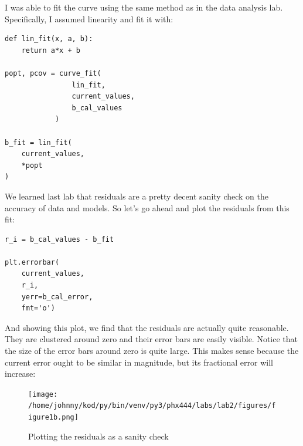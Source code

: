 \documentclass{article}
\begin{document}
I was able to fit the curve using the same method as in the data
analysis lab. Specifically, I assumed linearity and fit it with:

\begin{center}
\begin{minipage}[t]{.75\textwidth}
\begin{lstlisting}[frame=tlrb]
def lin_fit(x, a, b):
    return a*x + b

popt, pcov = curve_fit(
                lin_fit, 
                current_values, 
                b_cal_values
            )

b_fit = lin_fit(
    current_values, 
    *popt
)
\end{lstlisting}
\end{minipage}
\end{center}

We learned last lab that residuals are a pretty decent sanity check on the
accuracy of data and models. So let's go ahead and plot the residuals from this
fit:

\begin{center}
\begin{minipage}[t]{.75\textwidth}
\begin{lstlisting}[frame=tlrb]
r_i = b_cal_values - b_fit

plt.errorbar(
    current_values,
    r_i,
    yerr=b_cal_error,
    fmt='o')
\end{lstlisting}
\end{minipage}
\end{center}

And showing this plot, we find that the residuals are actually quite
reasonable. They are clustered around zero and their error bars are easily
visible. Notice that the size of the error bars around zero is quite large.
This makes sense because the current error ought to be similar in magnitude, but
its fractional error will increase:

\begin{figure}[H]
        \begin{center}
        \texttt{[image: /home/johnny/kod/py/bin/venv/py3/phx444/labs/lab2/figures/figure1b.png]}
        \caption{Plotting the residuals as a sanity check}
        \label{fig:fig_2}
        \end{center}
\end{figure}
\end{document}
